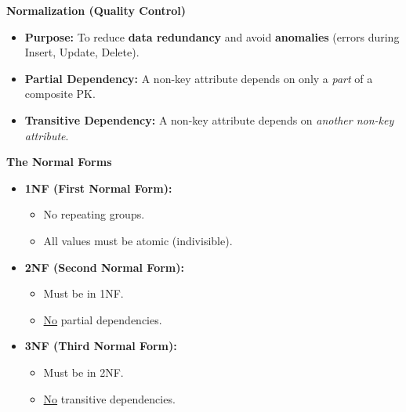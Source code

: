 \documentclass[a4paper, 8pt]{extarticle}
\newcommand{\subsectionheading}[1]{\normalsize\textbf{#1}}
\begin{document}
\begin{multicols}{2}
\subsectionheading{Normalization (Quality Control)}
\begin{itemize}
    \item \textbf{Purpose:} To reduce \textbf{data redundancy} and avoid \textbf{anomalies} (errors during Insert, Update, Delete).
\end{itemize}
\begin{tcolorbox}[title=\textbf{Functional Dependencies}]
\begin{itemize}
    \item \textbf{Partial Dependency:} A non-key attribute depends on only a \textit{part} of a composite PK.
    \item \textbf{Transitive Dependency:} A non-key attribute depends on \textit{another non-key attribute}.
\end{itemize}
\end{tcolorbox}
\subsectionheading{The Normal Forms}
\begin{itemize}
    \item \textbf{1NF (First Normal Form):}
    \begin{itemize}
        \item No repeating groups.
        \item All values must be atomic (indivisible).
    \end{itemize}
    \item \textbf{2NF (Second Normal Form):}
    \begin{itemize}
        \item Must be in 1NF.
        \item \underline{No} partial dependencies.
    \end{itemize}
    \item \textbf{3NF (Third Normal Form):}
    \begin{itemize}
        \item Must be in 2NF.
        \item \underline{No} transitive dependencies.
    \end{itemize}
\end{itemize}

\end{multicols}
\end{document}
